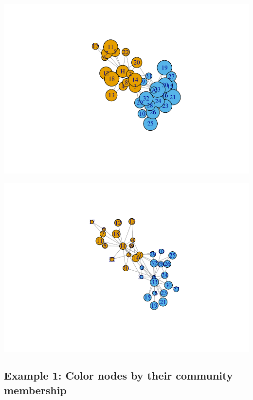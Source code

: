 \documentclass[
]{book}
\newenvironment{Shaded}{\begin{snugshade}}{\end{snugshade}}
\newcommand{\AttributeTok}[1]{\textcolor[rgb]{0.13,0.29,0.53}{#1}}
\newcommand{\CommentTok}[1]{\textcolor[rgb]{0.56,0.35,0.01}{\textit{#1}}}
\newcommand{\FloatTok}[1]{\textcolor[rgb]{0.00,0.00,0.81}{#1}}
\newcommand{\FunctionTok}[1]{\textcolor[rgb]{0.13,0.29,0.53}{\textbf{#1}}}
\newcommand{\NormalTok}[1]{#1}
\newcommand{\SpecialCharTok}[1]{\textcolor[rgb]{0.81,0.36,0.00}{\textbf{#1}}}
\begin{document}
\includegraphics{bookdown-demo_files/figure-latex/unnamed-chunk-129-1.pdf}

\begin{Shaded}
\end{Shaded}

\includegraphics{bookdown-demo_files/figure-latex/unnamed-chunk-129-2.pdf}

\subsection{Example 1: Color nodes by their community membership}\label{example-1-color-nodes-by-their-community-membership}
\end{document}
